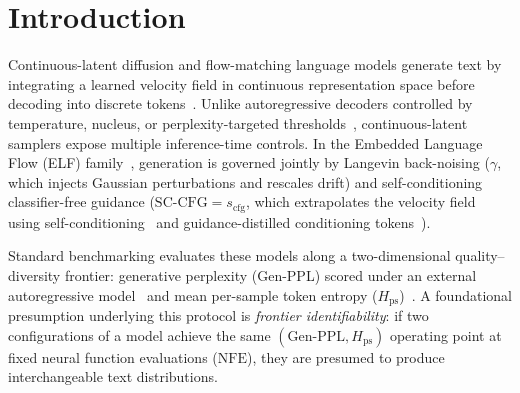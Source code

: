 \documentclass[11pt,a4paper]{article}
\begin{document}
\section{Introduction}
\label{sec:intro}

Continuous-latent diffusion and flow-matching language models generate text by integrating a learned velocity field in continuous representation space before decoding into discrete tokens~\citep{li2022diffusionlm,dieleman2022cdcd,lovelace2023ld4lg,jiang2026textldm,guo2026coladlm,hu2026elf}. Unlike autoregressive decoders controlled by temperature, nucleus, or perplexity-targeted thresholds~\citep{holtzman2020curious,nadeem2020systematic,basu2021mirostat}, continuous-latent samplers expose multiple inference-time controls. In the Embedded Language Flow (ELF) family~\citep{hu2026elf}, generation is governed jointly by Langevin back-noising ($\gamma$, which injects Gaussian perturbations and rescales drift) and self-conditioning classifier-free guidance ($\text{SC-CFG} = s_{\mathrm{cfg}}$, which extrapolates the velocity field using self-conditioning~\citep{chen2023analog} and guidance-distilled conditioning tokens~\citep{ho2022classifier}).

Standard benchmarking evaluates these models along a two-dimensional quality--diversity frontier: generative perplexity (Gen-PPL) scored under an external autoregressive model~\citep{radford2019language} and mean per-sample token entropy ($H_{\mathrm{ps}}$)~\citep{caccia2020language,pynadath2026generative}. A foundational presumption underlying this protocol is \emph{frontier identifiability}: if two configurations of a model achieve the same $(\text{Gen-PPL}, H_{\mathrm{ps}})$ operating point at fixed neural function evaluations ($\text{NFE}$), they are presumed to produce interchangeable text distributions.
\end{document}
